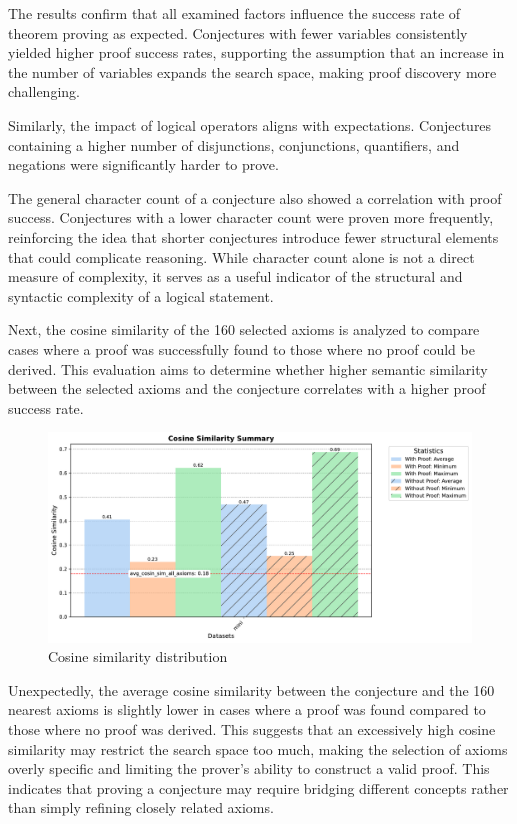 \documentclass[english,version-2020-11]{uzl-thesis}
\begin{document}
The results confirm that all examined factors influence the success rate of theorem proving as expected. Conjectures with fewer variables consistently yielded higher proof success rates, supporting the assumption that an increase in the number of variables expands the search space, making proof discovery more challenging.

Similarly, the impact of logical operators aligns with expectations. Conjectures containing a higher number of disjunctions, conjunctions, quantifiers, and negations were significantly harder to prove.

The general character count of a conjecture also showed a correlation with proof success. Conjectures with a lower character count were proven more frequently, reinforcing the idea that shorter conjectures introduce fewer structural elements that could complicate reasoning. While character count alone is not a direct measure of complexity, it serves as a useful indicator of the structural and syntactic complexity of a logical statement.

Next, the cosine similarity of the 160 selected axioms is analyzed to compare cases where a proof was successfully found to those where no proof could be derived. This evaluation aims to determine whether higher semantic similarity between the selected axioms and the conjecture correlates with a higher proof success rate.

\begin{figure}[h!]
    \centering
    \includegraphics[width=\textwidth]{cosine_similarity_mini_noAdded_summary.pdf}
    \caption{Cosine similarity distribution}
    \label{fig:cosine_similarity}
\end{figure}
\FloatBarrier

Unexpectedly, the average cosine similarity between the conjecture and the 160 nearest axioms is slightly lower in cases where a proof was found compared to those where no proof was derived. This suggests that an excessively high cosine similarity may restrict the search space too much, making the selection of axioms overly specific and limiting the prover's ability to construct a valid proof. This indicates that proving a conjecture may require bridging different concepts rather than simply refining closely related axioms.
\end{document}

